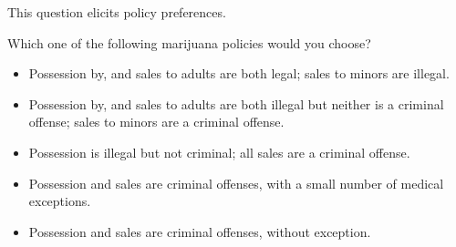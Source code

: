 This question elicits policy preferences.

\begin{tcolorbox}
Which one of the following marijuana policies would you choose?

\begin{itemize}
	\setlength\itemsep{-5pt}
	\item Possession by, and sales to adults are both legal; sales to minors are illegal.
	\item Possession by, and sales to adults are both illegal but neither is a criminal offense; sales to minors are a criminal offense.
	\item Possession is illegal but not criminal; all sales are a criminal offense.
	\item Possession and sales are criminal offenses, with a small number of medical exceptions.
	\item Possession and sales are criminal offenses, without exception.
\end{itemize}
\end{tcolorbox}
